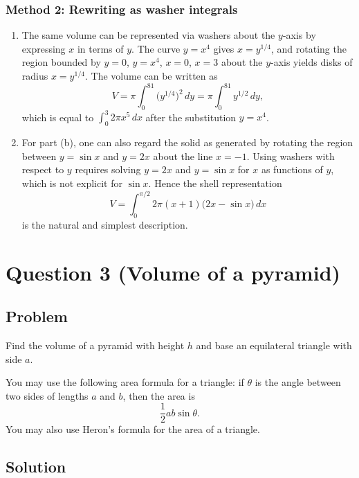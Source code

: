 \documentclass[12pt]{article}
\begin{document}
\subsubsection*{Method 2: Rewriting as washer integrals}

\begin{enumerate}[label=(\alph*)]
\item The same volume can be represented via washers about the \(y\)-axis by expressing \(x\) in terms of \(y\). The curve \(y=x^{4}\) gives \(x=y^{1/4}\), and rotating the region bounded by \(y=0\), \(y=x^{4}\), \(x=0\), \(x=3\) about the \(y\)-axis yields disks of radius \(x=y^{1/4}\). The volume can be written as
\[
V = \pi\int_{0}^{81} \big(y^{1/4}\big)^{2}\,dy
= \pi\int_{0}^{81} y^{1/2}\,dy,
\]
which is equal to \(\displaystyle \int_{0}^{3} 2\pi x^{5}\,dx\) after the substitution \(y=x^{4}\).

\item For part (b), one can also regard the solid as generated by rotating the region between \(y=\sin x\) and \(y=2x\) about the line \(x=-1\). Using washers with respect to \(y\) requires solving \(y=2x\) and \(y=\sin x\) for \(x\) as functions of \(y\), which is not explicit for \(\sin x\). Hence the shell representation
\[
V=\int_{0}^{\pi/2} 2\pi(x+1)\big(2x-\sin x\big)\,dx
\]
is the natural and simplest description.
\end{enumerate}

\newpage


\section*{Question 3 (Volume of a pyramid)}

\subsection*{Problem}
Find the volume of a pyramid with height \(h\) and base an equilateral triangle with side \(a\).

You may use the following area formula for a triangle: if \(\theta\) is the angle between two sides of lengths \(a\) and \(b\), then the area is
\[
\frac{1}{2}ab\sin\theta.
\]
You may also use Heron's formula for the area of a triangle.

\subsection*{Solution}
\end{document}
